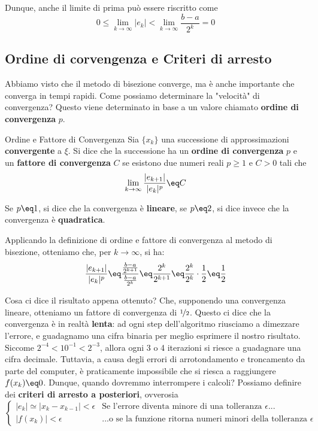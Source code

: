 Dunque, anche il limite di prima può essere riscritto come
\[ 0 \leq \lim_{k \to \infty} |e_k| < \lim_{k \to \infty} \frac{b - a}{2^k} = 0 \]

\subsection{Ordine di corvengenza e Criteri di arresto}

Abbiamo visto che il metodo di bisezione converge, ma è anche importante che converga in tempi rapidi. Come possiamo determinare la "velocità" di convergenza? Questo viene determinato in base a un valore chiamato \textbf{ordine di convergenza} $p$.

\begin{definition}{Ordine e Fattore di Convergenza}
    Sia $\{ x_k \}$ una successione di approssimazioni \textbf{convergente} a $\xi$. Si dice che la successione ha un \textbf{ordine di convergenza} $p$ e un \textbf{fattore di convergenza} $C$ se esistono due numeri reali $p \geq 1$ e $C > 0$ tali che
    \[ \lim_{k \to \infty} \frac{|e_{k + 1}|}{|e_k|^p} \eq C \]

    Se $p \eq 1$, si dice che la convergenza è \textbf{lineare}, se $p \eq 2$, si dice invece che la convergenza è \textbf{quadratica}.
\end{definition}

Applicando la definizione di ordine e fattore di convergenza al metodo di bisezione, otteniamo che, per $k \to \infty$, si ha:
\[ \frac{|e_{k + 1}|}{|e_k|^p} \eq \frac{\frac{b - a}{2^{k + 1}}}{\frac{b - a}{2^k}} \eq \frac{2^k}{2^{k + 1}} \eq \frac{2^k}{2^k} \cdot \frac{1}{2} \eq \frac{1}{2} \]

Cosa ci dice il risultato appena ottenuto? Che, supponendo una convergenza lineare, otteniamo un fattore di convergenza di $\nicefrac{1}{2}$. Questo ci dice che la convergenza è in realtà \textbf{lenta}: ad ogni step dell'algoritmo riusciamo a dimezzare l'errore, e guadagnamo una cifra binaria per meglio esprimere il nostro risultato. Siccome $2^{-4} < 10^{-1} < 2^{-3}$, allora ogni 3 o 4 iterazioni si riesce a guadagnare una cifra decimale.
\nwl
Tuttavia, a causa degli errori di arrotondamento e troncamento da parte del computer, è praticamente impossibile che si riesca a raggiungere $f(x_k) \eq 0$. Dunque, quando dovremmo interrompere i calcoli? Possiamo definire dei \textbf{criteri di arresto a posteriori}, ovverosia
\[ \begin{cases}
|e_k| \simeq |x_k - x_{k - 1}| < \epsilon & \text{Se l'errore diventa minore di una tolleranza } \epsilon ... \\
|f(x_k)| < \epsilon & \text{...o se la funzione ritorna numeri minori della tolleranza } \epsilon
\end{cases} \]

